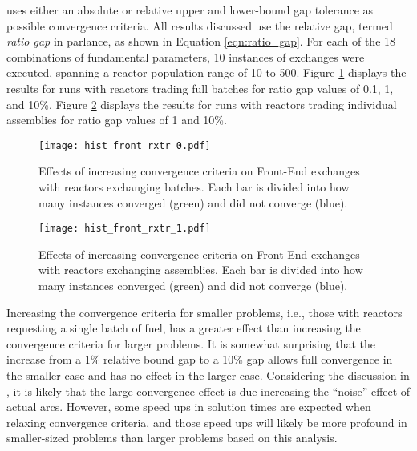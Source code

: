 \cbc uses either an absolute or relative upper and lower-bound gap tolerance as
possible convergence criteria. All results discussed use the relative gap,
termed \textit{ratio gap} in \cbc parlance, as shown in Equation
\ref{eqn:ratio_gap}. For each of the 18 combinations of fundamental parameters,
10 instances of exchanges were executed, spanning a reactor population range of
10 to 500. Figure \ref{fig:hist_front_rxtr_0} displays the results for runs with
reactors trading full batches for ratio gap values of 0.1, 1, and 10\%. Figure
\ref{fig:hist_front_rxtr_1} displays the results for runs with reactors trading
individual assemblies for ratio gap values of 1 and 10\%.

\begin{figure}[h!]
  \begin{center}
    \texttt{[image: hist\_front\_rxtr\_0.pdf]}
    \caption{
      \label{fig:hist_front_rxtr_0}
      Effects of increasing convergence criteria on Front-End exchanges with
      reactors exchanging batches. Each bar is divided into how many instances
      converged (green) and did not converge (blue). }
  \end{center}
\end{figure}

\begin{figure}[h!]
  \begin{center}
    \texttt{[image: hist\_front\_rxtr\_1.pdf]}
    \caption{
      \label{fig:hist_front_rxtr_1}
      Effects of increasing convergence criteria on Front-End exchanges with
      reactors exchanging assemblies. Each bar is divided into how many instances
      converged (green) and did not converge (blue).}
  \end{center}
\end{figure}

Increasing the convergence criteria for smaller problems, i.e., those with
reactors requesting a single batch of fuel, has a greater effect than increasing
the convergence criteria for larger problems. It is somewhat surprising that the
increase from a 1\% relative bound gap to a 10\% gap allows full convergence in
the smaller case and has no effect in the larger case. Considering the
discussion in , it is likely that the large
convergence effect is due increasing the ``noise'' effect of actual
arcs. However, some speed ups in solution times are expected when relaxing
convergence criteria, and those speed ups will likely be more profound in
smaller-sized problems than larger problems based on this analysis.

